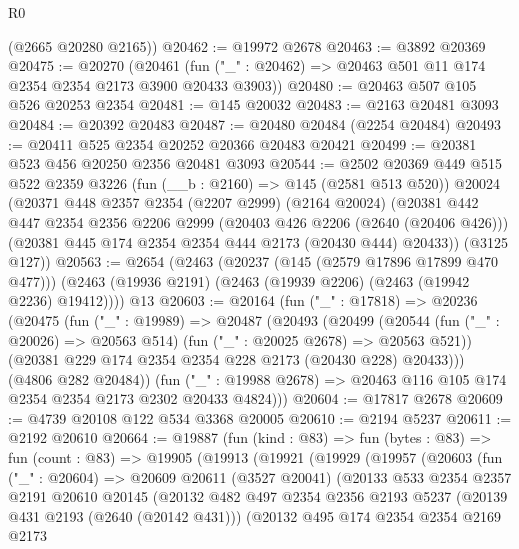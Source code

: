 \begin{lexlean}{R0}
\begin{coremodule}
      (@2665 @20280 @2165))
@20462 := @19972 @2678
@20463 := @3892 @20369
@20475 := @20270
    (@20461 (fun ("_" : @20462) => @20463 @501 @11 @174 @2354 @2354 @2173 @3900 @20433 @3903))
@20480 := @20463 @507 @105 @526 @20253 @2354
@20481 := @145 @20032
@20483 := @2163 @20481 @3093
@20484 := @20392 @20483
@20487 := @20480 @20484 (@2254 @20484)
@20493 := @20411 @525 @2354 @20252 @20366 @20483 @20421
@20499 := @20381 @523 @456 @20250 @2356 @20481 @3093
@20544 := @2502
    @20369
    @449
    @515
    @522
    @2359
    @3226
    (fun (__b : @2160) => @145 (@2581 @513 @520))
    @20024
    (@20371
      @448
      @2357
      @2354
      (@2207 @2999)
      (@2164 @20024)
      (@20381
        @442
        @447
        @2354
        @2356
        @2206
        @2999
        (@20403 @426 @2206 (@2640 (@20406 @426)))
        (@20381 @445 @174 @2354 @2354 @444 @2173 (@20430 @444) @20433))
      (@3125 @127))
@20563 := @2654
    (@2463
      (@20237 (@145 (@2579 @17896 @17899 @470 @477)))
      (@2463 (@19936 @2191) (@2463 (@19939 @2206) (@2463 (@19942 @2236) @19412))))
    @13
@20603 := @20164
    (fun ("_" : @17818) =>
    @20236
      (@20475
        (fun ("_" : @19989) =>
        @20487
          (@20493
            (@20499
              (@20544 (fun ("_" : @20026) => @20563 @514) (fun ("_" : @20025 @2678) => @20563 @521))
              (@20381 @229 @174 @2354 @2354 @228 @2173 (@20430 @228) @20433)))
          (@4806 @282 @20484))
        (fun ("_" : @19988 @2678) => @20463 @116 @105 @174 @2354 @2354 @2173 @2302 @20433 @4824)))
@20604 := @17817 @2678
@20609 := @4739 @20108 @122 @534 @3368 @20005
@20610 := @2194 @5237
@20611 := @2192 @20610
@20664 := @19887
    (fun (kind : @83) =>
    fun (bytes : @83) =>
    fun (count : @83) =>
    @19905
      (@19913
        (@19921
          (@19929
            (@19957
              (@20603
                (fun ("_" : @20604) =>
                @20609
                  @20611
                  (@3527 @20041)
                  (@20133
                    @533
                    @2354
                    @2357
                    @2191
                    @20610
                    @20145
                    (@20132
                      @482
                      @497
                      @2354
                      @2356
                      @2193
                      @5237
                      (@20139 @431 @2193 (@2640 (@20142 @431)))
                      (@20132
                        @495
                        @174
                        @2354
                        @2354
                        @2169
                        @2173

\end{coremodule}
\end{lexlean}
